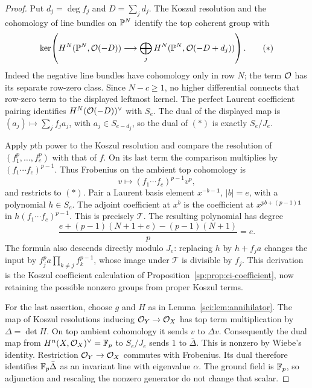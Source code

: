 \begin{proof}
Put \(d_j=\deg f_j\) and \(D=\sum_jd_j\).
The Koszul resolution and the cohomology of line bundles on
\(\mathbb P^N\) identify the top coherent group with
\[
 \ker\!\left(
 H^N(\mathbb P^N,\mathcal O(-D))
 \longrightarrow
 \bigoplus_jH^N(\mathbb P^N,\mathcal O(-D+d_j))
 \right).
 \tag{\(\ast\)}
\]
Indeed the negative line bundles have cohomology only in row \(N\);
the term \(\mathcal O\) has its separate row-zero class. Since \(N-c\geq1\),
no higher differential connects that row-zero term to the displayed
leftmost kernel. The perfect Laurent coefficient pairing identifies
\(H^N(\mathcal O(-D))^\vee\) with \(S_e\). The dual of the displayed map
is \((a_j)\mapsto\sum_j f_ja_j\), with
\(a_j\in S_{e-d_j}\), so the dual of \((\ast)\) is exactly \(S_e/J_e\).

Apply \(p\)th power to the Koszul resolution and compare the resolution
of \((f_1^p,\ldots,f_c^p)\) with that of \(f\).
On its last term the comparison multiplies by
\((f_1\cdots f_c)^{p-1}\). Thus Frobenius on the ambient top
cohomology is
\[
 v\longmapsto (f_1\cdots f_c)^{p-1}v^p,
\]
and restricts to \((\ast)\). Pair a Laurent basis element
\(x^{-b-\mathbf1}\), \(|b|=e\), with a polynomial \(h\in S_e\).
The adjoint coefficient at \(x^b\) is the coefficient at
\(x^{pb+(p-1)\mathbf1}\) in \(h(f_1\cdots f_c)^{p-1}\).
This is precisely \(\mathcal T\). The resulting polynomial has degree
\[
 \frac{e+(p-1)(N+1+e)-(p-1)(N+1)}p=e.
 \]
The formula also descends directly modulo \(J_e\): replacing \(h\)
by \(h+f_j a\) changes the input by
\(f_j^p a\prod_{k\ne j}f_k^{p-1}\), whose image under \(\mathcal T\)
is divisible by \(f_j\). This derivation is the Koszul coefficient
calculation of Proposition~\ref{sp:prop:ci-coefficient}, now retaining
the possible nonzero groups from proper Koszul terms.

For the last assertion, choose \(g\) and \(H\) as in
Lemma~\ref{sci:lem:annihilator}. The map of Koszul resolutions
inducing \(\mathcal O_Y\to\mathcal O_X\) has top term multiplication by
\(\Delta=\det H\). On top ambient cohomology it sends
\(v\) to \(\Delta v\). Consequently the dual map from
\(H^n(X,\mathcal O_X)^\vee=\mathbb F_p\) to \(S_e/J_e\) sends \(1\) to
\(\bar\Delta\). This is nonzero by Wiebe's identity.
Restriction \(\mathcal O_Y\to\mathcal O_X\) commutes with Frobenius.
Its dual therefore identifies \(\mathbb F_p\bar\Delta\) as an invariant line
with eigenvalue \(\alpha\). The ground field is \(\mathbb F_p\), so adjunction
and rescaling the nonzero generator do not change that scalar.
\end{proof}

